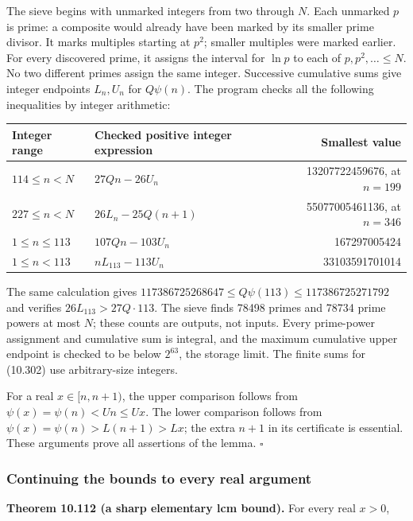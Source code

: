 \documentclass[
  11pt,
  a4paper,
]{article}
\newcounter{none} %
\begin{document}
The sieve begins with unmarked integers from two through \(N\). Each
unmarked \(p\) is prime: a composite would already have been marked by
its smaller prime divisor. It marks multiples starting at \(p^2\);
smaller multiples were marked earlier. For every discovered prime, it
assigns the interval for \(\ln p\) to each of \(p,p^2,\ldots\le N\). No
two different primes assign the same integer. Successive cumulative sums
give integer endpoints \(L_n,U_n\) for \(Q\psi(n)\). The program checks
all the following inequalities by integer arithmetic:

{\def\LTcaptype{none} %
\begin{longtable}[]{@{}llr@{}}
\toprule\noalign{}
Integer range & Checked positive integer expression & Smallest value \\
\midrule\noalign{}
\endhead
\bottomrule\noalign{}
\endlastfoot
\(114\le n<N\) & \(27Qn-26U_n\) & 13207722459676, at \(n=199\) \\
\(227\le n<N\) & \(26L_n-25Q(n+1)\) & 55077005461136, at \(n=346\) \\
\(1\le n\le113\) & \(107Qn-103U_n\) & 167297005424 \\
\(1\le n<113\) & \(nL_{113}-113U_n\) & 33103591701014 \\
\end{longtable}
}

The same calculation gives
\(117386725268647\le Q\psi(113)\le117386725271792\) and verifies
\(26L_{113}>27Q\cdot113\). The sieve finds 78498 primes and 78734 prime
powers at most \(N\); these counts are outputs, not inputs. Every
prime-power assignment and cumulative sum is integral, and the maximum
cumulative upper endpoint is checked to be below \(2^{63}\), the storage
limit. The finite sums for (10.302) use arbitrary-size integers.

For a real \(x\in[n,n+1)\), the upper comparison follows from
\(\psi(x)=\psi(n)<Un\le Ux\). The lower comparison follows from
\(\psi(x)=\psi(n)>L(n+1)>Lx\); the extra \(n+1\) in its certificate is
essential. These arguments prove all assertions of the lemma.
\(\square\)

\subsubsection{Continuing the bounds to every real
argument}\label{continuing-the-bounds-to-every-real-argument}

\textbf{Theorem 10.112 (a sharp elementary lcm bound).} For every real
\(x>0\),
\end{document}
